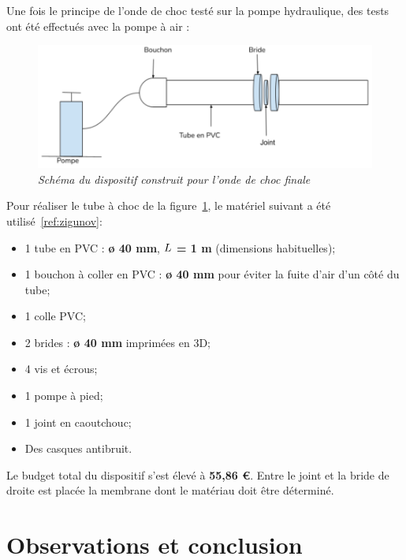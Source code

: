 \subsubsection{}
Une fois le principe de l'onde de choc testé sur la pompe hydraulique, des tests ont été effectués avec la pompe à air :
\begin{figure}[H]
	\centering
	\includegraphics[scale = 0.4]{figures/choc_air.png}
	\caption{\small{\textit{Schéma du dispositif construit pour l'onde de choc finale}}}
	\label{fig:choc_air}
\end{figure}
Pour réaliser le tube à choc de la figure~\ref{fig:choc_air}, le matériel suivant a été utilisé~\ref{ref:zigunov}:
\begin{itemize}
	\item 1 tube en PVC : \textbf{ø 40 mm}, \textbf{$\mathnormal{L}$ = 1 m} (dimensions habituelles);
	\item 1 bouchon à coller en PVC : \textbf{ø 40 mm} pour éviter la fuite d'air d'un côté du tube;
	\item 1 colle PVC;
	\item 2 brides : \textbf{ø 40 mm} imprimées en 3D;
	\item 4 vis et écrous;
	\item 1 pompe à pied;
	\item 1 joint en caoutchouc;
	\item Des casques antibruit.
\end{itemize}
Le budget total du dispositif s'est élevé à \textbf{55,86 €}.
Entre le joint et la bride de droite est placée la membrane dont le matériau doit être déterminé. 
\section{Observations et conclusion}

